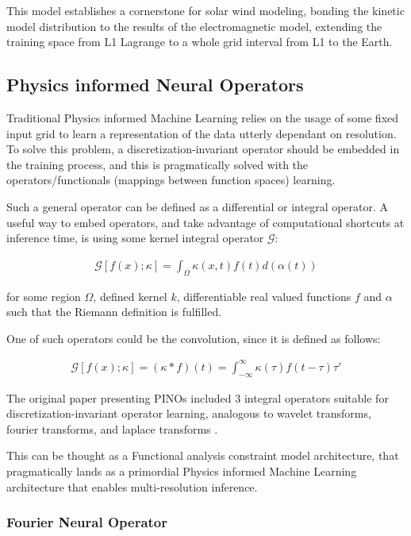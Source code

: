 \documentclass[12pt]{article}
\begin{document}
This model establishes a cornerstone for solar wind modeling, bonding the kinetic model distribution to the results of the electromagnetic model, extending the training space from     L1 Lagrange to a whole grid interval from L1 to the Earth.

\subsection{Physics informed Neural Operators}

Traditional Physics informed Machine Learning relies on the usage of some fixed input grid to learn a representation of the data utterly dependant on resolution. To solve this problem, a discretization-invariant operator should be embedded in the training process, and this is pragmatically solved with the operators/functionals (mappings between function spaces) learning.

Such a general operator can be defined as a differential or integral operator. A useful way to embed operators, and take advantage of computational shortcuts at inference time, is using some kernel integral operator $\mathcal{G}$:

\begin{align*}
    \mathcal{G}[f(x); \kappa] = \int_\Omega \kappa(x, t) f(t) d(\alpha(t))
\end{align*}

for some region $\Omega$, defined kernel $k$, differentiable real valued functions $f$ and $\alpha$ such that the Riemann definition is fulfilled.

One of such operators could be the convolution, since it is defined as follows:

\begin{align*}
    \mathcal{G}[ f(x); \kappa ] = (\kappa * f)(t) = \int_{-\infty}^\infty \kappa(\tau)f(t-\tau)\tau'
\end{align*}

The original paper presenting PINOs included 3 integral operators suitable for discretization-invariant operator learning, analogous to wavelet transforms, fourier transforms, and laplace transforms \cite{li2023physicsinformedneuraloperatorlearning}.

This can be thought as a Functional analysis constraint model architecture, that pragmatically lands as a primordial Physics informed Machine Learning architecture that enables multi-resolution inference.

\subsubsection{Fourier Neural Operator}
\end{document}
